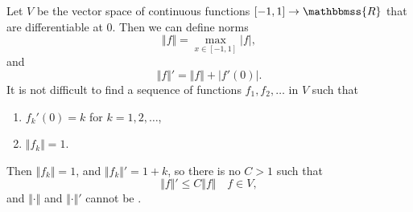 \documentclass[12pt]{article}
\newcommand{\R}{\mathbbmss{R}}
\begin{document}
Let $V$ be the vector space of continuous 
functions $[-1,1]\to \R$ that are differentiable at $0$. 
Then we can define norms
$$
\Vert f \Vert = \max_{x\in [-1,1]} |f|,
$$
and 
$$
\Vert f \Vert' = \Vert f \Vert+|f'(0)|.
$$
It is not difficult to find a sequence of functions $f_1, f_2, \ldots$
in $V$ such that 
\begin{enumerate}
\item $f_k'(0)=k$ for $k=1,2,\ldots$, 
\item $\Vert f_k\Vert = 1$.
\end{enumerate}
Then $\Vert f_k \Vert = 1$, and $\Vert f_k \Vert'=1+k$, so there is no
$C>1$ such that 
$$
   \Vert f \Vert' \le C \Vert f \Vert \quad f\in V,
$$
and $\Vert\cdot \Vert$ and $\Vert\cdot \Vert'$
cannot be .
\end{document}
